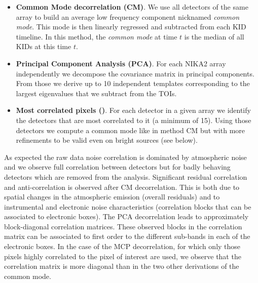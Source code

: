 \begin{itemize}
\item {\bf Common Mode decorrelation (CM)}. We use all detectors of the same
  array to build an average low frequency component nicknamed \emph{common
    mode}. This mode is then linearly regressed and subtracted from each KID
  timeline. In this method, the \emph{common mode} at time $t$ is the median of
  all KIDs at this time $t$.

\item {\bf Principal Component Analysis (PCA)}. For each NIKA2 array
  independently we decompose the covariance matrix in principal components. From
  those we derive up to 10 independent templates corresponding to the largest
  eigenvalues that we subtract from the TOIs.

\item {\bf Most correlated pixels (\cmoneb)}. For each detector in a given array we
  identify the detectors that are most correlated to it (a minimum of
  15). Using those detectors we compute a common mode like in method CM but with
  more refinements to be valid even on bright sources (see below).
\end{itemize}

As expected the raw data
noise correlation is dominated by atmospheric noise and we observe full
correlation between detectors but for badly behaving detectors which are removed
from the analysis. Significant residual correlation and anti-correlation is
observed after CM decorrelation. This is both due to spatial changes in the
atmospheric emission (overall residuals) and to instrumental and electronic
noise characteristics (correlation blocks that can be associated to electronic
boxes).  The PCA decorrelation leads to approximately block-diagonal correlation
matrices. These observed blocks in the correlation matrix can be associated to
first order to the different sub-bands in each of the electronic boxes. In the
case of the MCP decorrelation, for which only those pixels highly correlated to
the pixel of interest are used, we observe that the correlation matrix is more
diagonal than in the two other derivations of the common mode.

